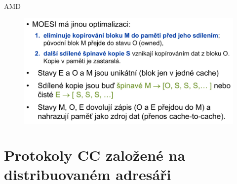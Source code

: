 \begin{compactitem}
    \item AMD
    \begin{figure}[H]
        \centering
        \includegraphics[width=0.9\linewidth]{moesi.pdf}
    \end{figure}
\end{compactitem}


\section{Protokoly CC založené na distribuovaném adresáři}

